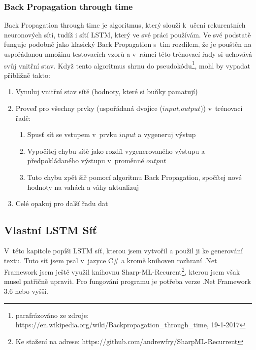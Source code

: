 \documentclass[a4paper]{article}
\begin{document}
\subsubsection{Back Propagation through time}
Back Propagation through time je algoritmus, který slouží k~učení rekurentních neuronových sítí, tudíž i sítí LSTM, který ve své práci používám. Ve své podstatě funguje podobně jako klasický Back Propagation s~tím rozdílem, že je pouštěn na uspořádanou množinu testovacích vzorů a v~rámci této trénovací řady si uchovává svůj vnitřní stav. Když tento algoritmus shrnu do pseudokódu\footnote{parafrázováno ze zdroje: https://en.wikipedia.org/wiki/Backpropagation\_through\_time, 19-1-2017}, mohl by vypadat přibližně takto:
\begin{enumerate}
	\item Vynuluj vnitřní stav sítě (hodnoty, které si buňky pamatují)
	\item Proveď pro všechny prvky (uspořádaná dvojice ($input$,$output$)) v~trénovací řadě:
		\begin{enumerate}
			\item Spusť síť se vstupem v~prvku $input$ a vygeneruj výstup
			\item Vypočítej chybu sítě jako rozdíl vygenerovaného výstupu a předpokládaného výstupu v~proměnné $output$
			\item Tuto chybu zpět šiř pomocí algoritmu Back Propagation, spočítej nové hodnoty na vahách a váhy aktualizuj			
		\end{enumerate}
	\item Celé opakuj pro další řadu dat
\end{enumerate}
\begin{center}
\clearpage
\section{Vlastní LSTM Síť}
\end{center}
V~této kapitole popíši LSTM síť, kterou jsem vytvořil a použil ji ke generování textu. Tuto síť jsem psal v~jazyce C\# a kromě knihoven rozhraní .Net Framework jsem ještě využil knihovnu Sharp-ML-Recurent\footnote{Ke stažení na adrese: https://github.com/andrewfry/SharpML-Recurrent}, kterou jsem však musel patřičně upravit. Pro fungování programu je potřeba verze .Net Framework 3.6 nebo vyšší.
\end{document}
